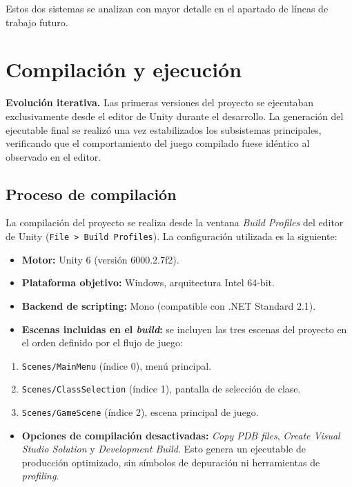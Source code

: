 Estos dos sistemas se analizan con mayor detalle en el apartado de líneas de trabajo futuro.



\section{Compilación y ejecución}


\textbf{Evolución iterativa.} Las primeras versiones del proyecto se ejecutaban exclusivamente desde el editor de Unity durante el desarrollo. La generación del ejecutable final se realizó una vez estabilizados los subsistemas principales, verificando que el comportamiento del juego compilado fuese idéntico al observado en el editor.

\subsection{Proceso de compilación}


La compilación del proyecto se realiza desde la ventana \textit{Build Profiles} del editor de Unity (\texttt{File > Build Profiles}). La configuración utilizada es la siguiente:

\begin{itemize}
\item \textbf{Motor:} Unity 6 (versión 6000.2.7f2).
\item \textbf{Plataforma objetivo:} Windows, arquitectura Intel 64-bit.
\item \textbf{Backend de scripting:} Mono (compatible con .NET Standard 2.1).
\item \textbf{Escenas incluidas en el \textit{build}:} se incluyen las tres escenas del proyecto en el orden definido por el flujo de juego:
\end{itemize}

\begin{enumerate}
\item \texttt{Scenes/MainMenu} (índice 0), menú principal.
\item \texttt{Scenes/ClassSelection} (índice 1), pantalla de selección de clase.
\item \texttt{Scenes/GameScene} (índice 2), escena principal de juego.
\end{enumerate}

\begin{itemize}
\item \textbf{Opciones de compilación desactivadas:} \textit{Copy PDB files}, \textit{Create Visual Studio Solution} y \textit{Development Build}. Esto genera un ejecutable de producción optimizado, sin símbolos de depuración ni herramientas de \textit{profiling}.
\end{itemize}

